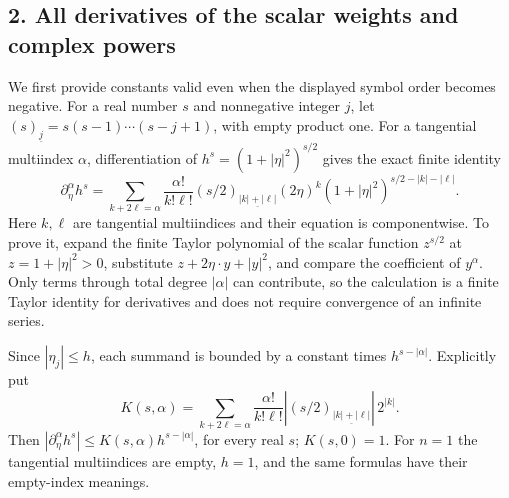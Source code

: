 \documentclass[
  11pt,
]{article}
\makeatletter
\let\ReaderOriginalAnchorStart\hyper@anchorstart
\let\ReaderOriginalAnchorEnd\hyper@anchorend
\let\ReaderPendingAliases\@empty
\def\ReaderArmAliases#1{\gdef\ReaderPendingAliases{#1}}
\def\hyper@anchorstart#1{\ReaderIfNativeAnchorTF{#1}{\ReaderPendingAliases\global\let\ReaderPendingAliases\@empty}{}\ReaderOriginalAnchorStart{#1}}
\makeatother
\begin{document}
\ReaderArmAliases{\ReaderOriginalAnchorStart{AN03-PIN-002}\ReaderOriginalAnchorEnd\begingroup\expandafter\def\csname @currentHref\endcsname{AN03-PIN-002}\label{AN03-PIN-002}\endgroup\ReaderOriginalAnchorStart{an03-pin-002-all-derivatives-of-the-scalar-weights-and-complex-powers}\ReaderOriginalAnchorEnd\begingroup\expandafter\def\csname @currentHref\endcsname{an03-pin-002-all-derivatives-of-the-scalar-weights-and-complex-powers}\label{an03-pin-002-all-derivatives-of-the-scalar-weights-and-complex-powers}\endgroup\ReaderOriginalAnchorStart{2-all-derivatives-of-the-scalar-weights-and-complex-powers}\ReaderOriginalAnchorEnd\begingroup\expandafter\def\csname @currentHref\endcsname{2-all-derivatives-of-the-scalar-weights-and-complex-powers}\label{2-all-derivatives-of-the-scalar-weights-and-complex-powers}\endgroup}
\subsection{2. All derivatives of the scalar weights and complex
powers}\label{all-derivatives-of-the-scalar-weights-and-complex-powers}

We first provide constants valid even when the displayed symbol order
becomes negative. For a real number \(s\) and nonnegative integer \(j\),
let \((s)_{\underline j}=s(s-1)\cdots(s-j+1)\), with empty product one.
For a tangential multiindex \(\alpha\), differentiation of
\(h^s=(1+|\eta|^2)^{s/2}\) gives the exact finite identity \[
 \partial_\eta^\alpha h^s
 =\sum_{k+2\ell=\alpha}
 \frac{\alpha!}{k!\ell!}
 (s/2)_{\underline{|k|+|\ell|}}
 (2\eta)^k
 (1+|\eta|^2)^{s/2-|k|-|\ell|}.
 \tag{PI10}
\] Here \(k,\ell\) are tangential multiindices and their equation is
componentwise. To prove it, expand the finite Taylor polynomial of the
scalar function \(z^{s/2}\) at \(z=1+|\eta|^2>0\), substitute
\(z+2\eta\cdot y+|y|^2\), and compare the coefficient of \(y^\alpha\).
Only terms through total degree \(|\alpha|\) can contribute, so the
calculation is a finite Taylor identity for derivatives and does not
require convergence of an infinite series.

Since \(|\eta_j|\leq h\), each summand is bounded by a constant times
\(h^{s-|\alpha|}\). Explicitly put \[
 K(s,\alpha)=
 \sum_{k+2\ell=\alpha}
 \frac{\alpha!}{k!\ell!}
 |(s/2)_{\underline{|k|+|\ell|}}|\,2^{|k|}.
 \tag{PI11}
\] Then \(|\partial_\eta^\alpha h^s|\leq K(s,\alpha)h^{s-|\alpha|}\),
for every real \(s\); \(K(s,0)=1\). For \(n=1\) the tangential
multiindices are empty, \(h=1\), and the same formulas have their
empty-index meanings.
\end{document}
